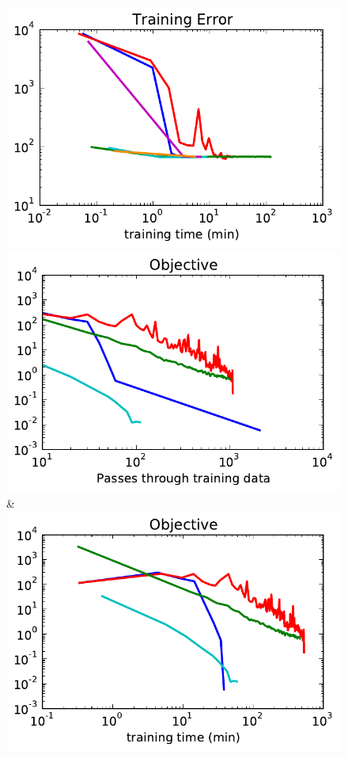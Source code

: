 \begin{figure}
\begin{tabu}
    \includegraphics[width=\linewidth]{evaluation/images/msrc_time_loss}\\
    \includegraphics[width=\linewidth]{evaluation/images/pascal}&%
    \includegraphics[width=\linewidth]{evaluation/images/pascal_time}\\

\end{tabu}
\end{figure}
